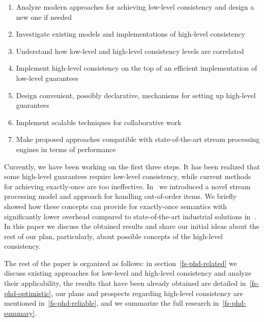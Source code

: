\begin{enumerate}
    \item Analyze modern approaches for achieving low-level consistency and design a new one if needed
    \item Investigate existing models and implementations of high-level consistency
    \item Understand how low-level and high-level consistency levels are correlated
    \item Implement high-level consistency on the top of an efficient implementation of low-level guarantees
    \item Design convenient, possibly declarative, mechanisms for setting up high-level guarantees
    \item Implement scalable techniques for collaborative work
    \item Make proposed approaches compatible with state-of-the-art stream processing engines in terms of performance
\end{enumerate}

Currently, we have been working on the first three steps. It has been realized that some high-level guarantees require low-level consistency, while current methods for achieving exactly-once are too ineffective. In~\cite{we2018seim} we introduced a novel stream processing model and approach for handling out-of-order items. We briefly showed how these concepts can provide for exactly-once semantics with significantly lower overhead compared to state-of-the-art industrial solutions in~\cite{we2018beyondmr}. In this paper we discuss the obtained results and share our initial ideas about the rest of our plan, particularly, about possible concepts of the high-level consistency. 

The rest of the paper is organized as follows: in section~\ref{fs-phd-related} we discuss existing approaches for low-level and high-level consistency and analyze their applicability, the results that have been already obtained are detailed in~\ref{fs-phd-optimistic}, our plans and prospects regarding high-level consistency are mentioned in~\ref{fs-phd-reliable}, and we summarize the full research in~\ref{fs-phd-summary}.

